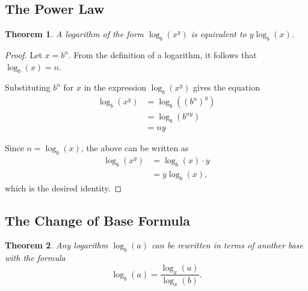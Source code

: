 \documentclass[parskip]{scrartcl}
\newtheorem*{theorem}{Theorem}
\begin{document}
\subsection{The Power Law}

\begin{theorem}
  A logarithm of the form \(\log_{b}(x^{y})\) is equivalent to \(y\log_{b}(x)\).
\end{theorem}

\begin{proof}
  Let \(x = b^{n}\). From the definition of a logarithm, it follows that
  \(\log_{b}(x) = n\).

  Substituting \(b^{n}\) for \(x\) in the expression \(\log_{b}(x^{y})\) gives
  the equation
  \begin{equation*}
    \begin{split}
      \log_{b}(x^{y}) &= \log_{b}({(b^{n})}^{y}) \\
      &= \log_{b}(b^{ny}) \\
      &= ny
    \end{split}
  \end{equation*}

  Since \(n = \log_{b}(x)\), the above can be written as
  \begin{equation*}
    \begin{split}
      \log_{b}(x^{y}) &= \log_{b}(x) · y \\
      &= y\log_{b}(x),
    \end{split}
  \end{equation*}
  which is the desired identity.
\end{proof}

\subsection{The Change of Base Formula}

\begin{theorem}
  Any logarithm \(\log_{b}(a)\) can be rewritten in terms of another base with
  the formula
  \[ \log_{b}(a) = \frac{\log_{x}(a)}{\log_{x}(b)}. \]
\end{theorem}
\end{document}
